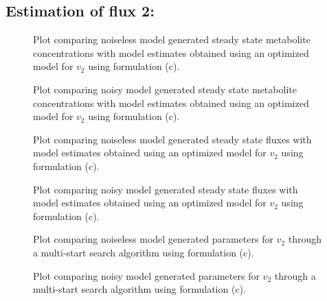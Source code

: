 \documentclass[10pt]{article}
\begin{document}
	\subsection{Estimation of flux 2:}
	\begin{figure}[!tbhp]
		\caption{Plot comparing noiseless model generated steady state metabolite concentrations with model estimates obtained using an optimized model for $v_2$ using formulation (c). }
	\end{figure}
	\begin{figure}[!tbhp]
		\caption{Plot comparing noisy model generated steady state metabolite concentrations with model estimates obtained using an optimized model for $v_2$ using formulation (c). }
	\end{figure}
	\begin{figure}[!tbhp]
		\caption{Plot comparing noiseless model generated steady state fluxes with model estimates obtained using an optimized model for $v_2$ using formulation (c). }
	\end{figure}
	\begin{figure}[!tbhp]
		\caption{Plot comparing noisy model generated steady state fluxes with model estimates obtained using an optimized model for $v_2$ using formulation (c). }
	\end{figure}
	\begin{figure}[!tbhp]
		\caption{Plot comparing noiseless model generated parameters for $v_2$ through a multi-start search algorithm using formulation (c). }
	\end{figure}
	\begin{figure}[!tbhp]
		\caption{Plot comparing noisy model generated parameters for $v_2$ through a multi-start search algorithm using formulation (c). }
	\end{figure}
	\clearpage
	
\end{document}
